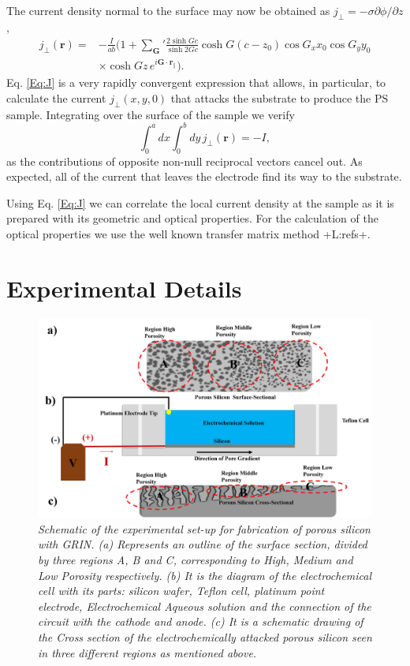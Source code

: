 \documentclass{article}
\newcommand{\notaL}[1]{{\color{blue}+L:#1+}}
\begin{document}
The current density normal to the surface may now be obtained as
$j_\perp=-\sigma\partial\phi/\partial z$,
\begin{equation}
  \label{Eq:J}
  \begin{split}
    j_\perp(\bm r) =& -\frac{I}{ab}\biggl(1+{\sum_{\bm G}}'\frac{2\sinh
      Gc}{\sinh 2Gc}\cosh G(c-z_0)\cos G_x x_0 \cos G_y y_0\\
    &\times \cosh Gz\, e^{i\bm G\cdot\bm r_\|}\biggr).
  \end{split}
\end{equation}
Eq. \eqref{Eq:J} is a very rapidly convergent expression that allows,
in particular, to calculate the current $j_\perp(x,y,0)$ that attacks
the substrate to produce the PS sample.
Integrating over the surface of the sample we verify
\begin{equation}
  \label{eq:intj}
  \int_0^adx\int_0^bdy\,j_\perp(\bm r)=-I,
\end{equation}
as the contributions of opposite non-null reciprocal vectors cancel
out. As expected, all of the current that leaves the electrode find
its way to the substrate.

Using Eq. \eqref{Eq:J} we can correlate the local current density at
the sample as it is prepared with its geometric and optical
properties. For the calculation of the optical properties we use the
well known transfer matrix method \notaL{refs}.

\section{Experimental Details}
\begin{figure}
  \centering
  \includegraphics[scale=0.6]{Images/DE1}
\caption{\emph{Schematic of the experimental set-up for
      fabrication of porous silicon with GRIN. (a) Represents an
      outline of the surface section, divided by three regions
      A, B and C, corresponding to High, Medium and Low Porosity
      respectively. (b) It is the diagram of the electrochemical
      cell with its parts: silicon wafer, Teflon cell, platinum
      point electrode, Electrochemical Aqueous solution and the
      connection of the circuit with the cathode and anode. (c)
      It is a schematic drawing of the Cross section of the
      electrochemically attacked porous silicon seen in three
      different regions as mentioned above. }}
    \label{fig:DE1}
  \end{figure}
\end{document}
